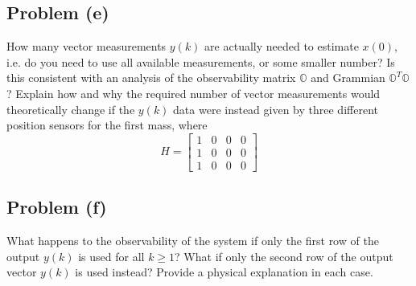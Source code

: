 \documentclass[11pt]{article}
\begin{document}
\subsection*{Problem (e)}
How many vector measurements $y(k)$ are actually needed to estimate $x(0)$, i.e. do you need to use all available measurements, or some smaller number? Is this consistent with an analysis of the observability matrix $\mathbb{O}$ and Grammian $\mathbb{O}^T\mathbb{O}$? Explain how and why the required number of vector measurements would theoretically change if the $y(k)$ data were instead given by three different position sensors for the first mass, where 
\begin{equation*}
	H=\begin{bmatrix} 1&0&0&0 \\ 1&0&0&0 \\ 1&0&0&0 \end{bmatrix}
\end{equation*}

\subparagraph*{}

\subsection*{Problem (f)}
What happens to the observability of the system if only the first row of the output $y(k)$ is used for all $k\geq 1$? What if only the second row of the output vector $y(k)$ is used instead? Provide a physical explanation in each case.
\end{document}
